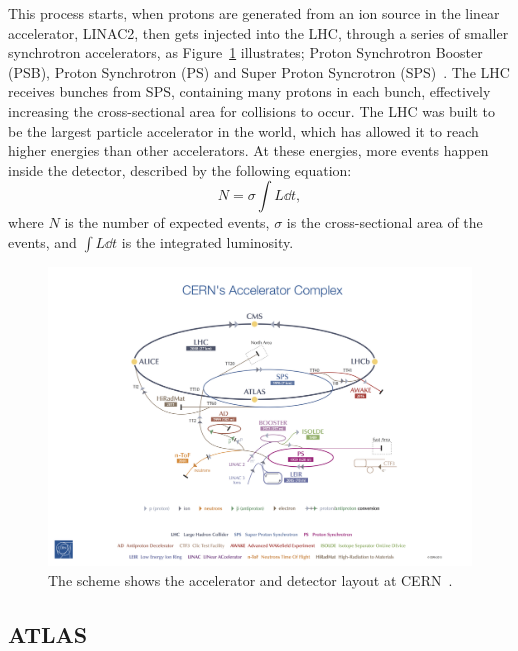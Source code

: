\documentclass[12pt,a4paper]{article}
\numberwithin{equation}{section}
\begin{document}
This process starts, when protons are generated from an ion source in the linear
accelerator, LINAC2, then gets injected into the LHC, through a series of
smaller synchrotron accelerators, as Figure~\ref{fig:lhc} illustrates; Proton
Synchrotron Booster (PSB), Proton Synchrotron (PS) and Super Proton Syncrotron
(SPS)~\cite[135]{Evans_2008}. The LHC receives bunches from SPS, containing many
protons in each bunch, effectively increasing the cross-sectional area for
collisions to occur. The LHC was built to be the largest particle accelerator in the
world, which has allowed it to reach higher energies than other accelerators. At
these energies, more events happen inside the detector, described by the
following equation:
\begin{equation}
  N = \sigma \int L \dd t,
\end{equation}
where $N$ is the number of expected events, $\sigma$ is the cross-sectional area of
the events, and $\int L \dd t$ is the integrated luminosity.

\begin{figure}[H]
	\includegraphics[width=\linewidth]{figures/cern.jpg}
	\caption{The scheme shows the accelerator and detector layout at
    CERN~\cite{Haffner:1621894}.}\label{fig:lhc}
\end{figure}


\subsection{ATLAS}
\end{document}
